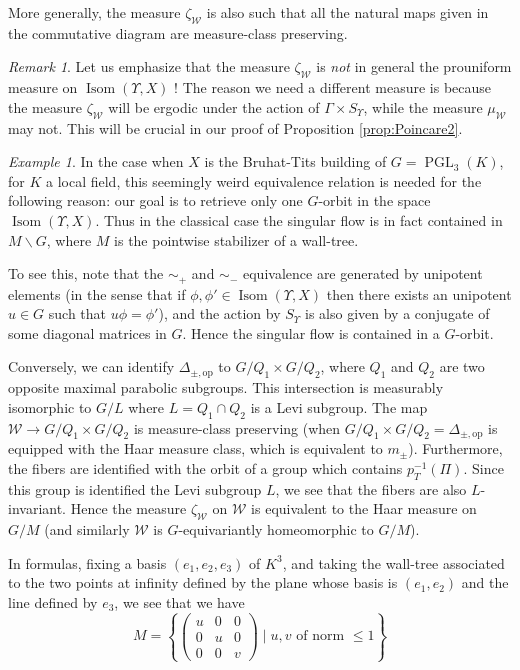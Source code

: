 \documentclass[a4paper, 11pt]{article}
\theoremstyle{plain}
\theoremstyle{definition}
\theoremstyle{remark}
\newtheorem{remark}[proposition]{Remark}
\newtheorem{example}[proposition]{Example}
\DeclareMathOperator{\PGL}{PGL}
\DeclareMathOperator{\Isom}{Isom}
\newcommand{\scrW}{\mathscr W}
\newcommand{\pmop}{ {\pm,\mathrm{op}}}
\begin{document}
 More generally, the measure $\zeta_\scrW$ is also such that all the natural maps given in the commutative diagram \cite[5.4 (3)]{BCL} are measure-class preserving.
 
\begin{remark}
Let us emphasize that the measure $\zeta_\scrW$ is \emph{not} in general the prouniform measure on $\Isom(\Upsilon,X)$ ! The reason we need a different measure is because the measure $\zeta_\scrW$ will be ergodic under the action of $\Gamma\times S_\Upsilon$, while the measure $\mu_\scrW$ may not. This will be crucial in our proof of Proposition \ref{prop:Poincare2}.
\end{remark}

\begin{example}
In the case when $X$ is the Bruhat-Tits building of $G=\PGL_3(K)$, for $K$ a local field, this seemingly weird equivalence relation is needed for the following reason: our goal is to retrieve only one $G$-orbit in the space $\Isom(\Upsilon,X)$. 
Thus in the classical case the singular flow is in fact contained in
$M\backslash G$, where $M$ is the pointwise stabilizer of a wall-tree. 

To see this, note that the $\sim_+$ and $\sim_-$ equivalence are generated by unipotent elements (in the sense that if $\phi,\phi'\in\Isom(\Upsilon,X)$ then there exists an unipotent $u\in G$ such that $u\phi=\phi'$), and the action by $S_\Upsilon$ is also given by a conjugate of some diagonal matrices in $G$. Hence the singular flow is contained in a $G$-orbit. 

Conversely, we can identify $\Delta_\pmop$ to $G/Q_1\times G/Q_2$, where $Q_1$ and $Q_2$ are two opposite maximal parabolic subgroups. This intersection is measurably isomorphic to $G/L$ where $L=Q_1\cap Q_2$ is a Levi subgroup. The map $\scrW\to G/Q_1\times G/Q_2$ is measure-class preserving (when $G/Q_1\times G/Q_2=\Delta_\pmop$ is equipped with the Haar measure class, which is equivalent to $m_\pm$). Furthermore, the fibers are identified with the orbit of a group which contains $p_T^{-1}(\Pi)$. Since this group is identified the Levi subgroup $L$, we see that the fibers are also  $L$-invariant. Hence the measure $\zeta_\scrW$ on $\scrW$ is equivalent to the Haar measure on $G/M$ (and similarly $\scrW$ is $G$-equivariantly homeomorphic to $G/M$).

In formulas, fixing a basis $(e_1,e_2,e_3)$ of $K^3$, and taking the wall-tree associated to the two points at infinity defined by the plane whose basis is $(e_1,e_2)$ and the line defined by $e_3$, we see that we have
$$M=\left\{
\begin{pmatrix}
    u& 0&0\\
    0&u&0\\
    0&0&v
\end{pmatrix}\mid u,v \textrm{ of norm $\leq 1$}\right\}$$ 


\end{example}
\end{document}
